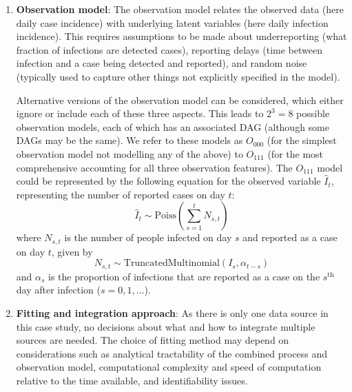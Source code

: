 \documentclass{article}
\begin{document}
\begin{enumerate}
\item \textbf{Observation model}: The observation model relates the observed data (here daily case incidence) with underlying latent variables (here daily infection incidence). 
This requires assumptions to be made about underreporting (what fraction of infections are detected cases), reporting delays (time between infection and a case being detected and reported), and random noise (typically used to capture other things not explicitly specified in the model).

Alternative versions of the observation model can be considered, which either ignore or include each of these three aspects. This leads to $2^3=8$ possible observation models, each of which has an associated DAG (although some DAGs may be the same).
We refer to these models as $O_{000}$ (for the simplest observation model not modelling any of the above) to $O_{111}$ (for the most comprehensive accounting for all three observation features). 
The $O_{111}$ model could be represented by the following equation for the observed variable $\hat{I}_t$, representing the number of reported cases on day $t$:
\begin{equation}
    \hat{I}_t \sim \mathrm{Poiss}\left( \sum_{s=1}^t N_{s,t}\right)
\end{equation}
where $N_{s,t}$ is the number of people infected on day $s$ and reported as a case on day $t$, given by
\begin{equation}
    N_{s,t} \sim \mathrm{TruncatedMultinomial}\left( I_s, \alpha_{t-s}\right) 
\end{equation}
and $\alpha_s$ is the proportion of infections that are reported as a case on the $s^\mathrm{th}$ day after infection ($s=0,1,\ldots$). 


\item \textbf{Fitting and integration approach}: As there is only one data source in this case study, no decisions about what and how to integrate multiple sources are needed. The choice of fitting method may depend on considerations such as analytical tractability of the combined process and observation model, computational complexity and speed of computation relative to the time available, and identifiability issues. 
 


\end{enumerate}
\end{document}
